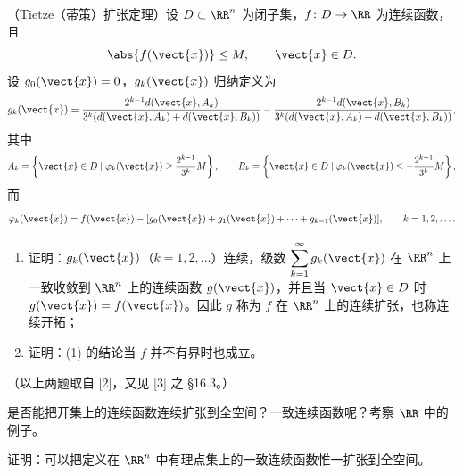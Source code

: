 \begin{xreferenceproblem}[8]
（Tietze（蒂策）扩张定理）设 $D\subset\RR^n$ 为闭子集，$f\colon D\to\RR$ 为连续函数，且
  \[
    \abs{f(\vect{x})}\le M,\qquad \vect{x}\in D.
  \]
  设 $g_0(\vect{x})=0$，$g_k(\vect{x})$ 归纳定义为
  \[
    g_k(\vect{x})=
    \frac{2^{k-1}d(\vect{x},A_k)}{3^k(d(\vect{x},A_k)+d(\vect{x},B_k))}
    -\frac{2^{k-1}d(\vect{x},B_k)}{3^k(d(\vect{x},A_k)+d(\vect{x},B_k))},
  \]
  其中
  \[
    A_k=\left\{\vect{x}\in D\mid\varphi_k(\vect{x})\ge\frac{2^{k-1}}{3^k}M\right\},
    \qquad
    B_k=\left\{\vect{x}\in D\mid\varphi_k(\vect{x})\le-\frac{2^{k-1}}{3^k}M\right\},
  \]
  而
  \[
    \varphi_k(\vect{x})
    =f(\vect{x})-[g_0(\vect{x})+g_1(\vect{x})+\cdots+g_{k-1}(\vect{x})],
    \qquad k=1,2,\ldots.
  \]
  \begin{enumerate}[label=(\arabic*)]
    \item 证明：$g_k(\vect{x})$（$k=1,2,\ldots$）连续，级数 $\displaystyle\sum_{k=1}^{\infty}g_k(\vect{x})$ 在 $\RR^n$ 上一致收敛到 $\RR^n$ 上的连续函数 $g(\vect{x})$，并且当 $\vect{x}\in D$ 时 $g(\vect{x})=f(\vect{x})$。因此 $g$ 称为 $f$ 在 $\RR^n$ 上的连续扩张，也称连续开拓；
    \item 证明：(1) 的结论当 $f$ 并不有界时也成立。
  \end{enumerate}
  （以上两题取自 [2]，又见 [3] 之 §16.3。）
\end{xreferenceproblem}

\begin{xreferenceproblem}[9]
是否能把开集上的连续函数连续扩张到全空间？一致连续函数呢？考察 $\RR$ 中的例子。
\end{xreferenceproblem}

\begin{xreferenceproblem}[10]
证明：可以把定义在 $\RR^n$ 中有理点集上的一致连续函数惟一扩张到全空间。
\end{xreferenceproblem}
